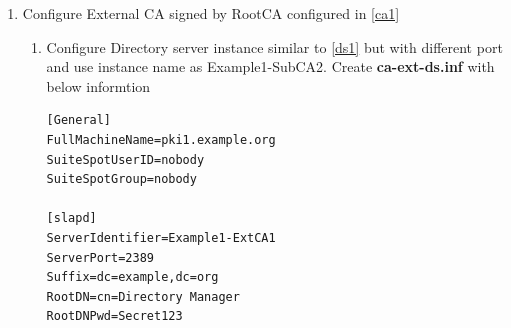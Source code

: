 \documentclass[a4paper]{article}
\begin{document}
\begin{enumerate}[label*=\arabic*.]
\begin{enumerate}[label*=\arabic*.]
\begin{lstlisting}[style=configFile]
[Tomcat]
pki_ajp_port=18009
pki_tomcat_server_port=18005

[CA]
pki_subordinate=True
pki_issuing_ca=https://pki1.example.org:8443
pki_ca_signing_subject_dn=cn=CA Subordinate Signing,o=example.org
pki_ds_hostname=pki1.example.org
pki_ds_ldap_port=1389
pki_ds_password=Secret123
pki_ds_secure_connection=False
                    \end{lstlisting}
                \item  Run pkispawn with above configuration to configure SubCA.
                    \begin{lstlisting}[style=bashInputStyle]
$ pkispawn -s CA -f subca1.inf -vv
                    \end{lstlisting}
                \item Verify Subsystem status using systemctl and pkidaemon commands
                    \begin{lstlisting}[style=bashInputStyle]
$ systemctl status pki-tomcatd@Example1-SubCA1
$ pkidaemon status tomcat Example1-SubCA1
                    \end{lstlisting}
                \end{enumerate}
            \item \label{ca3} Configure External CA signed by RootCA configured in \ref{ca1}
                \begin{enumerate}[label*=\arabic*.]
                    \item Configure Directory server instance similar to \ref{ds1} but with different port and use instance name as Example1-SubCA2.
                        Create \textbf{ca-ext-ds.inf} with below informtion
                        \begin{lstlisting}[style=configFile]
[General]
FullMachineName=pki1.example.org 
SuiteSpotUserID=nobody
SuiteSpotGroup=nobody

[slapd]
ServerIdentifier=Example1-ExtCA1
ServerPort=2389
Suffix=dc=example,dc=org
RootDN=cn=Directory Manager
RootDNPwd=Secret123


\end{lstlisting}
\end{enumerate}
\end{enumerate}
\end{document}
